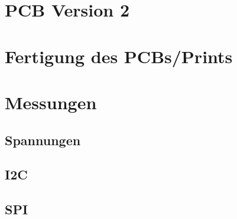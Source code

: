 \begin{inhalt}
   \section{PCB Version 2}

\section{Fertigung des PCBs/Prints}

\section{Messungen}
	\subsection{Spannungen}
	\subsection{I2C}
	\subsection{SPI}

\end{inhalt}